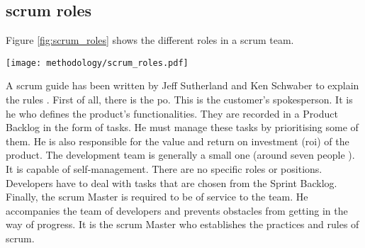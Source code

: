 \subsection{\Gls{scrum} roles}
Figure \ref{fig:scrum_roles} shows the different roles in a \gls{scrum} team.
\begin{center}
    \begingroup
    \texttt{[image: methodology/scrum\_roles.pdf]}
    \label{fig:scrum_roles}
    \endgroup
\end{center}
A \gls{scrum} guide has been written by Jeff Sutherland and Ken Schwaber to explain the rules \cite{scrum_guide}. First of all, there is the \acrfull{po}. This is the customer's spokesperson. It is he who defines the product's functionalities. They are recorded in a Product Backlog in the form of tasks. He must manage these tasks by prioritising some of them. He is also responsible for the value and return on investment (\acrshort{roi}) of the product. The development team is generally a small one (around seven people \cite{course_MA_ITProMan}). It is capable of self-management. There are no specific roles or positions. Developers have to deal with tasks that are chosen from the Sprint Backlog. Finally, the \gls{scrum} Master is required to be of service to the team. He accompanies the team of developers and prevents obstacles from getting in the way of progress. It is the \gls{scrum} Master who establishes the practices and rules of \gls{scrum}.

